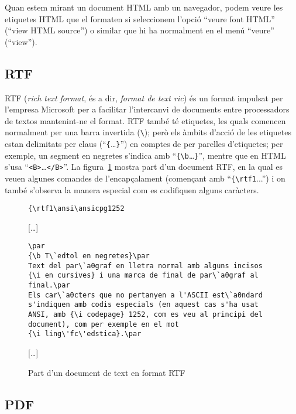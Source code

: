 Quan estem mirant un document HTML amb un navegador, podem veure les etiquetes HTML que el formaten si seleccionem l'opció ``veure font
HTML'' (``view HTML source'') o similar que hi ha normalment en el
menú ``veure'' (``view'').

\subsection{RTF}
\label{s3:RTF}

RTF (\emph{rich text format}, és a dir, \emph{format de text ric}) és
un format impulsat per l'empresa Microsoft per a facilitar
l'intercanvi de documents entre processadors de textos mantenint-ne el
format. RTF també té etiquetes, les quals comencen normalment per una
barra invertida (\verb+\+); però els àmbits d'acció de les etiquetes
estan delimitats per claus (``\verb+{+\ldots\verb+}+'') en comptes de
per parelles d'etiquetes; per exemple, un segment en negretes s'indica
amb ``\verb+{\b+\ldots\verb+}+'', mentre que en HTML s'usa
``\verb+<B>+\ldots\verb+</B>+''. La figura~\ref{fg:RTF} mostra part
d'un document RTF, en la qual es veuen algunes comandes de
l'encapçalament (començant amb ``\verb+{\rtf1+...'') i on també
  s'observa la manera especial com es codifiquen alguns caràcters.

\begin{figure}
\begin{center}
\begin{verbatim}
{\rtf1\ansi\ansicpg1252
\end{verbatim}
[\ldots]
\begin{verbatim}
\par
{\b T\`edtol en negretes}\par
Text del par\`a0graf en lletra normal amb alguns incisos 
{\i en cursives} i una marca de final de par\`a0graf al 
final.\par  
Els car\`a0cters que no pertanyen a l'ASCII est\`a0ndard 
s'indiquen amb codis especials (en aquest cas s'ha usat 
ANSI, amb {\i codepage} 1252, com es veu al principi del 
document), com per exemple en el mot 
{\i ling\'fc\'edstica}.\par
\end{verbatim}
[\ldots]
\end{center}
\caption{Part d'un document de text en format RTF}
\label{fg:RTF}
\end{figure}

\subsection{PDF}

